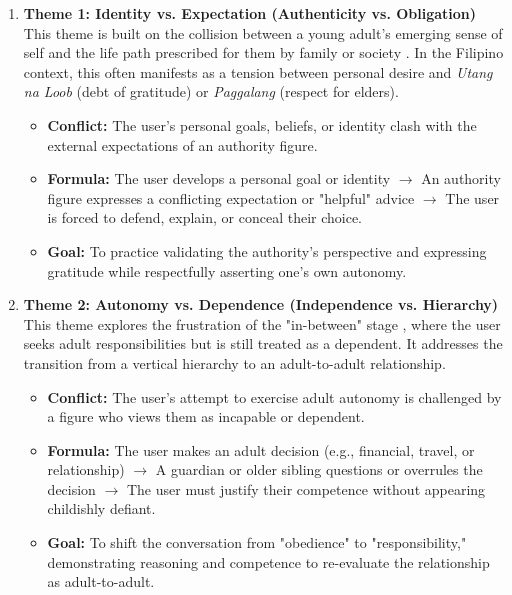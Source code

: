 \begin{enumerate}
    \item \textbf{Theme 1: Identity vs. Expectation (Authenticity vs. Obligation)} \\
    This theme is built on the collision between a young adult’s emerging sense of self \cite{arnett_emerging_2000} and the life path prescribed for them by family or society \cite{havighurst_developmental_1948}. In the Filipino context, this often manifests as a tension between personal desire and \textit{Utang na Loob} (debt of gratitude) or \textit{Paggalang} (respect for elders).
    \begin{itemize}
    \item \textbf{Conflict:} The user’s personal goals, beliefs, or identity clash with the external expectations of an authority figure.
    \item \textbf{Formula:} The user develops a personal goal or identity $\rightarrow$ An authority figure expresses a conflicting expectation or "helpful" advice $\rightarrow$ The user is forced to defend, explain, or conceal their choice.
    \item \textbf{Goal:} To practice validating the authority’s perspective and expressing gratitude while respectfully asserting one's own autonomy.
    \end{itemize}

    \item \textbf{Theme 2: Autonomy vs. Dependence (Independence vs. Hierarchy)} \\
    This theme explores the frustration of the "in-between" stage \cite{arnett_emerging_2000}, where the user seeks adult responsibilities \cite{havighurst_developmental_1948} but is still treated as a dependent. It addresses the transition from a vertical hierarchy to an adult-to-adult relationship.
    \begin{itemize}
    \item \textbf{Conflict:} The user’s attempt to exercise adult autonomy is challenged by a figure who views them as incapable or dependent.
    \item \textbf{Formula:} The user makes an adult decision (e.g., financial, travel, or relationship) $\rightarrow$ A guardian or older sibling questions or overrules the decision $\rightarrow$ The user must justify their competence without appearing childishly defiant.
    \item \textbf{Goal:} To shift the conversation from "obedience" to "responsibility," demonstrating reasoning and competence to re-evaluate the relationship as adult-to-adult.
    \end{itemize}


\end{enumerate}
